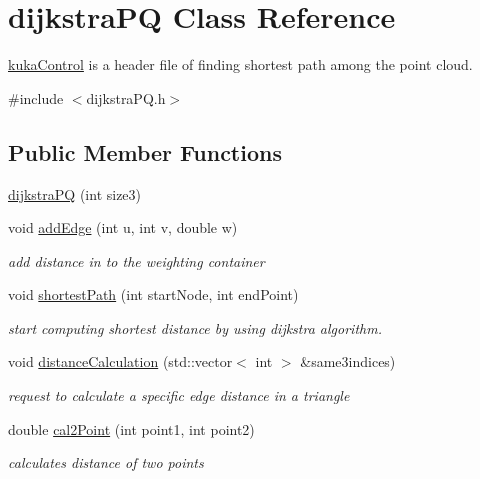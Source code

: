 \hypertarget{classdijkstraPQ}{}\section{dijkstra\+PQ Class Reference}
\label{classdijkstraPQ}


\hyperlink{classkukaControl}{kuka\+Control} is a header file of finding shortest path among the point cloud.  




{\ttfamily \#include $<$dijkstra\+P\+Q.\+h$>$}

\subsection*{Public Member Functions}
\begin{DoxyCompactItemize}
\item 
\hyperlink{classdijkstraPQ_a8edda94ff604564b1ae3273bfdb3014e}{dijkstra\+PQ} (int size3)
\item 
void \hyperlink{classdijkstraPQ_a372f1b10a704b46cbfd228dfab2a8a97}{add\+Edge} (int u, int v, double w)
\begin{DoxyCompactList}\small\item\em add distance in to the weighting container \end{DoxyCompactList}\item 
void \hyperlink{classdijkstraPQ_a2cc6c8ed66ce145f965eface6cc7853c}{shortest\+Path} (int start\+Node, int end\+Point)
\begin{DoxyCompactList}\small\item\em start computing shortest distance by using dijkstra algorithm. \end{DoxyCompactList}\item 
void \hyperlink{classdijkstraPQ_a6268acee3ef08aa87bd45b8dcb330f12}{distance\+Calculation} (std\+::vector$<$ int $>$ \&same3indices)
\begin{DoxyCompactList}\small\item\em request to calculate a specific edge distance in a triangle \end{DoxyCompactList}\item 
double \hyperlink{classdijkstraPQ_a4da44970fd1314b425e0d00af7ba726c}{cal2\+Point} (int point1, int point2)
\begin{DoxyCompactList}\small\item\em calculates distance of two points \end{DoxyCompactList}\item 

\end{DoxyCompactItemize}

